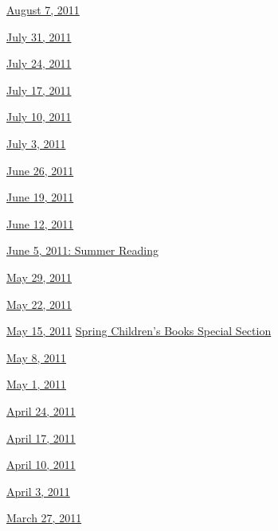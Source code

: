 \href{http://www.nytimes.com/indexes/2011/08/07/books/review/index.html}{August
7, 2011}

\href{http://www.nytimes.com/indexes/2011/07/30/books/review/index.html}{July
31, 2011}

\href{http://www.nytimes.com/indexes/2011/07/23/books/review/index.html}{July
24, 2011}

\href{http://www.nytimes.com/indexes/2011/07/16/books/review/index.html}{July
17, 2011}

\href{http://www.nytimes.com/indexes/2011/07/09/books/review/index.html}{July
10, 2011}

\href{http://www.nytimes.com/indexes/2011/07/02/books/review/index.html}{July
3, 2011}

\href{http://www.nytimes.com/indexes/2011/06/25/books/review/index.html}{June
26, 2011}

\href{http://www.nytimes.com/indexes/2011/06/18/books/review/index.html}{June
19, 2011}

\href{http://www.nytimes.com/indexes/2011/06/11/books/review/index.html}{June
12, 2011}

\href{http://www.nytimes.com/indexes/2011/06/04/books/review/index.html}{June
5, 2011: Summer Reading}

\href{http://www.nytimes.com/indexes/2011/05/28/books/review/index.html}{May
29, 2011}

\href{http://www.nytimes.com/indexes/2011/05/21/books/review/index.html}{May
22, 2011}

\href{http://www.nytimes.com/indexes/2011/05/14/books/review/index.html}{May
15, 2011} \textbar{}
\href{http://www.nytimes.com/indexes/2011/05/13/arts/artsspecial/index.html}{Spring
Children's Books Special Section}

\href{http://www.nytimes.com/indexes/2011/05/07/books/review/index.html}{May
8, 2011}

\href{http://www.nytimes.com/indexes/2011/04/30/books/review/index.html}{May
1, 2011}

\href{http://www.nytimes.com/indexes/2011/04/23/books/review/index.html}{April
24, 2011}

\href{http://www.nytimes.com/indexes/2011/04/16/books/review/index.html}{April
17, 2011}

\href{http://www.nytimes.com/indexes/2011/04/09/books/review/index.html}{April
10, 2011}

\href{http://www.nytimes.com/indexes/2011/04/02/books/review/index.html}{April
3, 2011}

\href{http://www.nytimes.com/indexes/2011/03/26/books/review/index.html}{March
27, 2011}

